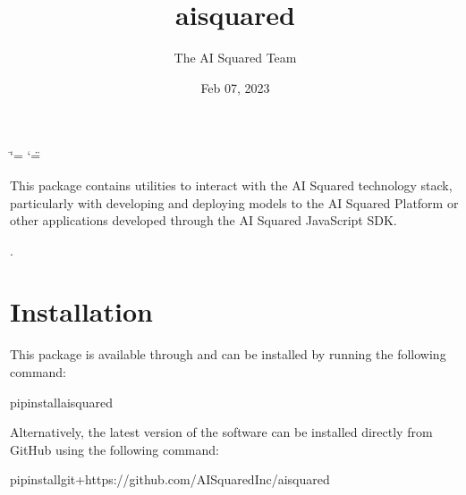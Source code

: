 \documentclass[letterpaper,10pt,english]{sphinxmanual}
\title{aisquared}
\date{Feb 07, 2023}
\author{The AI Squared Team}
\let\sphinxpxdimen\pdfpxdimen\else\newdimen\sphinxpxdimen
\begin{document}
\ifdefined\shorthandoff
  \ifnum\catcode`\=\string=\active\shorthandoff{=}\fi
  \ifnum\catcode`\"=\active{}\fi
\fi

\pagestyle{empty}
\sphinxmaketitle
\pagestyle{plain}
\sphinxtableofcontents
\pagestyle{normal}
\label{\detokenize{index::doc}}
\noindent{\hspace*{\fill}\sphinxincludegraphics[width=400\sphinxpxdimen]{{aisquared}.png}\hspace*{\fill}}

\begin{DUlineblock}{0em}
\item[] 
\item[] 
\end{DUlineblock}



\sphinxAtStartPar
This package contains utilities to interact with the AI Squared technology stack, particularly with developing and deploying models to the AI Squared Platform or other applications developed through the AI Squared JavaScript SDK.

\sphinxAtStartPar
{} 

\sphinxAtStartPar
{}.

\begin{DUlineblock}{0em}
\item[] 
\end{DUlineblock}


\chapter{Installation}
\label{\detokenize{index:installation}}
\sphinxAtStartPar
This package is available through  and can be installed by running the following command:

\begin{sphinxVerbatim}[commandchars=\\\{\}]
pipinstallaisquared
\end{sphinxVerbatim}

\sphinxAtStartPar
Alternatively, the latest version of the software can be installed directly from GitHub using the following command:

\begin{sphinxVerbatim}[commandchars=\\\{\}]
pipinstallgit+https://github.com/AISquaredInc/aisquared
\end{sphinxVerbatim}
\end{document}
